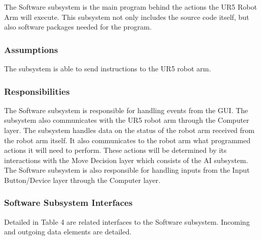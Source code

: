 The Software subsystem is the main program behind the actions the UR5 Robot Arm will execute. This subsystem not only includes the source code itself, but also software packages needed for the program.

\subsubsection{Assumptions}
The subsystem is able to send instructions to the UR5 robot arm.

\subsubsection{Responsibilities}

The Software subsystem is responsible for handling events from the GUI. The subsystem also communicates with the UR5 robot arm through the Computer layer. The subsystem handles data on the status of the robot arm received from the robot arm itself. It also communicates to the robot arm what programmed actions it will need to perform. These actions will be determined by its interactions with the Move Decision layer which consists of the AI subsystem. The Software subsystem is also responsible for handling inputs from the Input Button/Device layer through the Computer layer.

\subsubsection{Software Subsystem Interfaces}

Detailed in Table 4 are related interfaces to the Software subsystem. Incoming and outgoing data elements are detailed.

